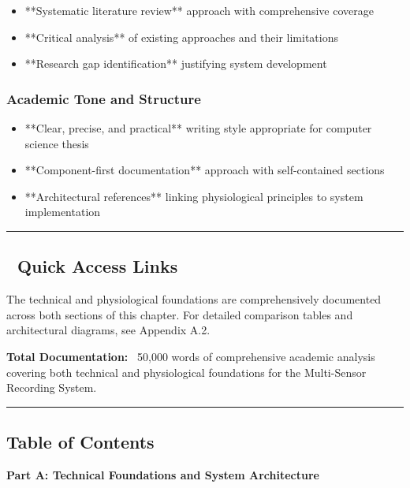 \documentclass[11pt,a4paper]{article}
\begin{document}
\begin{itemize}
\item **Systematic literature review** approach with comprehensive coverage
\item **Critical analysis** of existing approaches and their limitations
\item **Research gap identification** justifying system development

\end{itemize}
\subsubsection{Academic Tone and Structure}

\begin{itemize}
\item **Clear, precise, and practical** writing style appropriate for computer science thesis
\item **Component-first documentation** approach with self-contained sections
\item **Architectural references** linking physiological principles to system implementation

\end{itemize}
\hrule

\subsection{🚀 Quick Access Links}

The technical and physiological foundations are comprehensively documented across both sections of this chapter. For
detailed comparison tables and architectural diagrams, see Appendix A.2.

\textbf{Total Documentation:} ~50,000 words of comprehensive academic analysis covering both technical and physiological
foundations for the Multi-Sensor Recording System.

\hrule

\subsection{Table of Contents}

\textbf{Part A: Technical Foundations and System Architecture}
\end{document}
